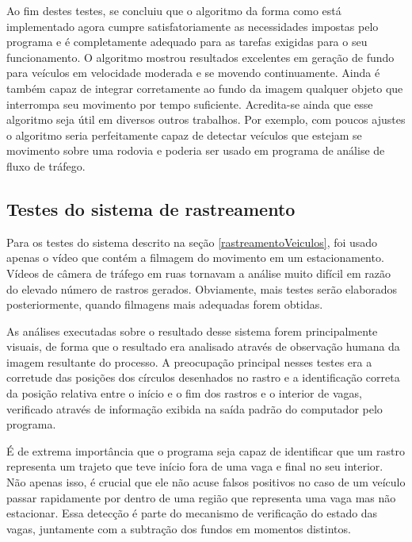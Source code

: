 Ao fim destes testes, se concluiu que o algoritmo da forma como está implementado agora cumpre satisfatoriamente as necessidades impostas pelo programa e é completamente adequado para as tarefas exigidas para o seu funcionamento. O algoritmo mostrou resultados excelentes em geração de fundo para veículos em velocidade moderada e se movendo continuamente. Ainda é também capaz de integrar corretamente ao fundo da imagem qualquer objeto que interrompa seu movimento por tempo suficiente. Acredita-se ainda que esse algoritmo seja útil em diversos outros trabalhos. Por exemplo, com poucos ajustes o algoritmo seria perfeitamente capaz de detectar veículos que estejam se movimento sobre uma rodovia e poderia ser usado em programa de análise de fluxo de tráfego.

\subsection{Testes do sistema de rastreamento} \label{testesRastreamento}

Para os testes do sistema descrito na seção \ref{rastreamentoVeiculos}, foi usado apenas o vídeo que contém a filmagem do movimento em um estacionamento. Vídeos de câmera de tráfego em ruas tornavam a análise muito difícil em razão do elevado número de rastros gerados. Obviamente, mais testes serão elaborados posteriormente, quando filmagens mais adequadas forem obtidas.

As análises executadas sobre o resultado desse sistema forem principalmente visuais, de forma que o resultado era analisado através de observação humana da imagem resultante do processo. A preocupação principal nesses testes era a corretude das posições dos círculos desenhados no rastro e a identificação correta da posição relativa entre o início e o fim dos rastros e o interior de vagas, verificado através de informação exibida na saída padrão do computador pelo programa.

É de extrema importância que o programa seja capaz de identificar que um rastro representa um trajeto que teve início fora de uma vaga e final no seu interior. Não apenas isso, é crucial que ele não acuse falsos positivos no caso de um veículo passar rapidamente por dentro de uma região que representa uma vaga mas não estacionar. Essa detecção é parte do mecanismo de verificação do estado das vagas, juntamente com a subtração dos fundos em momentos distintos.


